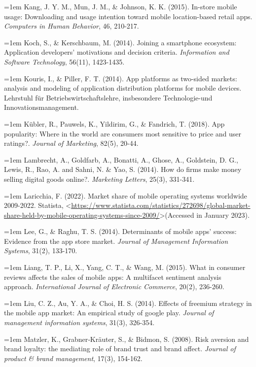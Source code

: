 \hangindent=1em
Kang, J. Y. M., Mun, J. M., \& Johnson, K. K. (2015). In-store mobile usage: Downloading and usage intention toward mobile location-based retail apps. \textit{Computers in Human Behavior}, 46, 210-217.

\hangindent=1em
Koch, S., \& Kerschbaum, M. (2014). Joining a smartphone ecosystem: Application developers’ motivations and decision criteria. \textit{Information and Software Technology}, 56(11), 1423-1435.

\hangindent=1em
Kouris, I., \& Piller, F. T. (2014). App platforms as two-sided markets: analysis and modeling of application distribution platforms for mobile devices. Lehrstuhl für Betriebswirtschaftslehre, insbesondere Technologie-und Innovationsmanagement.

\hangindent=1em
Kübler, R., Pauwels, K., Yildirim, G., \& Fandrich, T. (2018). App popularity: Where in the world are consumers most sensitive to price and user ratings?. \textit{Journal of Marketing}, 82(5), 20-44.

\hangindent=1em
Lambrecht, A., Goldfarb, A., Bonatti, A., Ghose, A., Goldstein, D. G., Lewis, R., Rao, A. and Sahni, N. \& Yao, S. (2014). How do firms make money selling digital goods online?. \textit{Marketing Letters}, 25(3), 331-341.

\hangindent=1em
Laricchia, F. (2022). Market share of mobile operating systems worldwide 2009-2022. Statista, \textless \url{https://www.statista.com/statistics/272698/global-market-share-held-by-mobile-operating-systems-since-2009/}\textgreater (Accessed in January 2023).

\hangindent=1em
Lee, G., \& Raghu, T. S. (2014). Determinants of mobile apps' success: Evidence from the app store market. \textit{Journal of Management Information Systems}, 31(2), 133-170.

\hangindent=1em
Liang, T. P., Li, X., Yang, C. T., \& Wang, M. (2015). What in consumer reviews affects the sales of mobile apps: A multifacet sentiment analysis approach. \textit{International Journal of Electronic Commerce}, 20(2), 236-260.

\hangindent=1em
Liu, C. Z., Au, Y. A., \& Choi, H. S. (2014). Effects of freemium strategy in the mobile app market: An empirical study of google play. \textit{Journal of management information systems}, 31(3), 326-354.

\hangindent=1em
Matzler, K., Grabner‐Kräuter, S., \& Bidmon, S. (2008). Risk aversion and brand loyalty: the mediating role of brand trust and brand affect. \textit{Journal of product \& brand management}, 17(3), 154-162.

